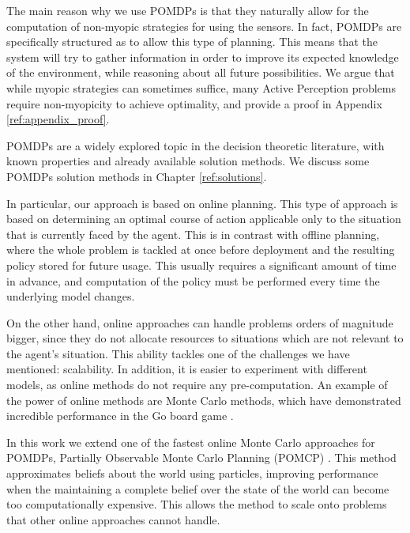 The main reason why we use POMDPs is that they naturally allow for the computation of non-myopic
strategies for using the sensors. In fact, POMDPs are specifically structured as to allow this type
of planning. This means that the system will try to gather information in order to improve its
expected knowledge of the environment, while reasoning about all future possibilities. We argue that
while myopic strategies can sometimes suffice, many Active Perception problems require non-myopicity
to achieve optimality, and provide a proof in Appendix \ref{ref:appendix_proof}. 

POMDPs are a widely explored topic in the decision theoretic literature, with known properties and
already available solution methods. We discuss some POMDPs solution methods in Chapter
\ref{ref:solutions}.


In particular, our approach is based on online planning. This type of approach is based on
determining an optimal course of action applicable only to the situation that is currently faced by
the agent. This is in contrast with offline planning, where the whole problem is tackled at once
before deployment and the resulting policy stored for future usage. This usually requires a
significant amount of time in advance, and computation of the policy must be performed every time
the underlying model changes.

On the other hand, online approaches can handle problems orders of magnitude bigger, since they do
not allocate resources to situations which are not relevant to the agent's situation. This ability
tackles one of the challenges we have mentioned: scalability. In addition, it is easier to
experiment with different models, as online methods do not require any pre-computation. An example
of the power of online methods are Monte Carlo methods, which have demonstrated incredible
performance in the Go board game \cite{cit:mcts}.

In this work we extend one of the fastest online Monte Carlo approaches for POMDPs, Partially
Observable Monte Carlo Planning (POMCP) \cite{cit:pomcp}. This method approximates beliefs about the
world using particles, improving performance when the maintaining a complete belief over the state
of the world can become too computationally expensive. This allows the method to scale onto problems
that other online approaches cannot handle.

